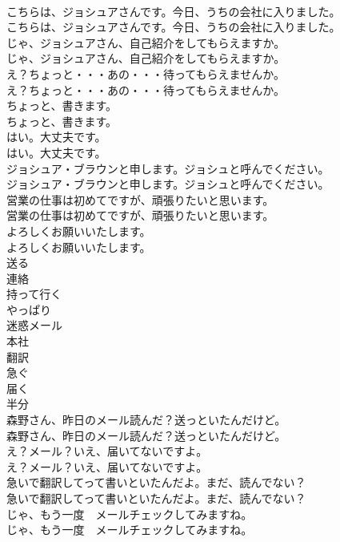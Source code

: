 \documentclass[8pt]{extreport}
\begin{document}
\begin{CJK}{UTF8}{min}
\\	こちらは、ジョシュアさんです。今日、うちの会社に入りました。	
\\	こちらは、ジョシュアさんです。今日、うちの会社に入りました。 
\\	じゃ、ジョシュアさん、自己紹介をしてもらえますか。	
\\	じゃ、ジョシュアさん、自己紹介をしてもらえますか。 
\\	え？ちょっと・・・あの・・・待ってもらえませんか。	
\\	え？ちょっと・・・あの・・・待ってもらえませんか。 
\\	ちょっと、書きます。	
\\	ちょっと、書きます。 
\\	はい。大丈夫です。	
\\	はい。大丈夫です。 
\\	ジョシュア・ブラウンと申します。ジョシュと呼んでください。	
\\	ジョシュア・ブラウンと申します。ジョシュと呼んでください。 
\\	営業の仕事は初めてですが、頑張りたいと思います。	
\\	営業の仕事は初めてですが、頑張りたいと思います。 
\\	よろしくお願いいたします。	
\\	よろしくお願いいたします。 
\\	送る
\\	連絡
\\	持って行く
\\	やっぱり
\\	迷惑メール
\\	本社
\\	翻訳
\\	急ぐ
\\	届く
\\	半分
\\	森野さん、昨日のメール読んだ？送っといたんだけど。	
\\	森野さん、昨日のメール読んだ？送っといたんだけど。 
\\	え？メール？いえ、届いてないですよ。	
\\	え？メール？いえ、届いてないですよ。 
\\	急いで翻訳してって書いといたんだよ。まだ、読んでない？	
\\	急いで翻訳してって書いといたんだよ。まだ、読んでない？ 
\\	じゃ、もう一度　メールチェックしてみますね。	
\\	じゃ、もう一度　メールチェックしてみますね。 

\end{CJK}
\end{document}
